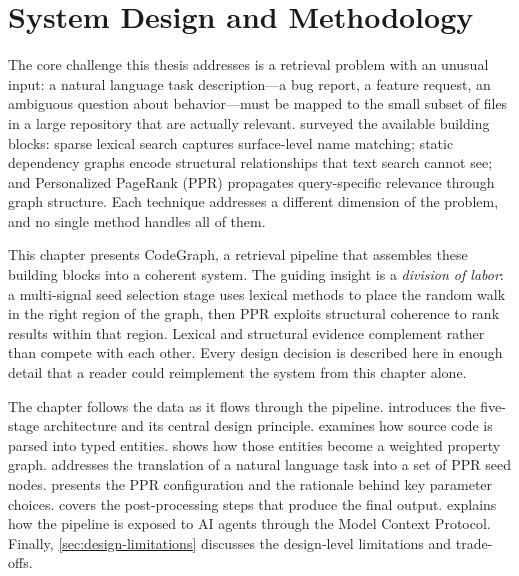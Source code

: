 
\chapter{System Design and Methodology}
\label{ch:design}

The core challenge this thesis addresses is a retrieval problem with an unusual input: a natural language task description---a bug report, a feature request, an ambiguous question about behavior---must be mapped to the small subset of files in a large repository that are actually relevant.  surveyed the available building blocks: sparse lexical search captures surface-level name matching; static dependency graphs encode structural relationships that text search cannot see; and Personalized PageRank (PPR) propagates query-specific relevance through graph structure. Each technique addresses a different dimension of the problem, and no single method handles all of them.

This chapter presents CodeGraph, a retrieval pipeline that assembles these building blocks into a coherent system. The guiding insight is a \emph{division of labor}: a multi-signal seed selection stage uses lexical methods to place the random walk in the right region of the graph, then PPR exploits structural coherence to rank results within that region. Lexical and structural evidence complement rather than compete with each other. Every design decision is described here in enough detail that a reader could reimplement the system from this chapter alone.

The chapter follows the data as it flows through the pipeline.  introduces the five-stage architecture and its central design principle.  examines how source code is parsed into typed entities.  shows how those entities become a weighted property graph.  addresses the translation of a natural language task into a set of PPR seed nodes.  presents the PPR configuration and the rationale behind key parameter choices.  covers the post-processing steps that produce the final output.  explains how the pipeline is exposed to AI agents through the Model Context Protocol. Finally, \cref{sec:design-limitations} discusses the design-level limitations and trade-offs.


